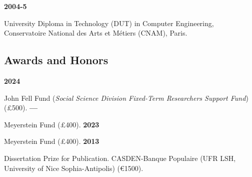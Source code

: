 \documentclass{article}
\newcommand{\fr}[1]{} %
\newcommand{\en}[1]{#1}   %
\begin{document}
\smallbreak
\textbf{2004-5} 
\fr{Diplôme universitaire de technologie (DUT) Génie informatique, Conservatoire National des Arts et Métiers (CNAM), Paris.}
\en{University Diploma in Technology (DUT) in Computer Engineering, Conservatoire National des Arts et Métiers (CNAM), Paris.}

\subsection*{\fr{Prix et récompenses}\en{Awards and Honors}}

\textbf{2024} 
\fr{Fonds John Fell (\textit{Social Science Division Fixed-Term Researchers Support Fund}) (£500).}
\en{John Fell Fund (\textit{Social Science Division Fixed-Term Researchers Support Fund}) (£500).}
\smallbreak
\textbf{---} 
\fr{Fonds Meyerstein (£400).}
\en{Meyerstein Fund (£400).}
\smallbreak
\textbf{2023} 
\fr{Fonds Meyerstein (£400).}
\en{Meyerstein Fund (£400).}
\smallbreak
\textbf{2013} 
\fr{Prix de thèse pour publication. CASDEN-Banque Populaire (UFR LSH, Université Nice Sophia-Antipolis) (1500€).}
\en{Dissertation Prize for Publication. CASDEN-Banque Populaire (UFR LSH, University of Nice Sophia-Antipolis) (€1500).}
\end{document}
